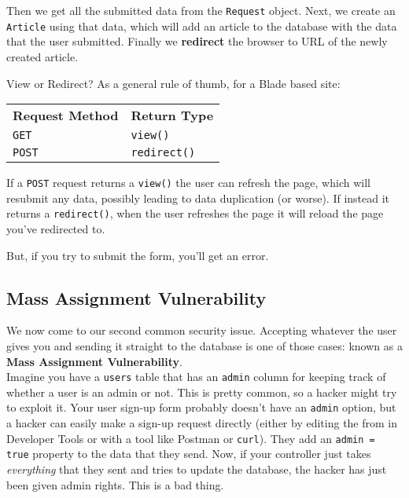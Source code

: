 Then we get all the submitted data from the \texttt{Request} object. Next, we create an \texttt{Article} using that data, which will add an article to the database with the data that the user submitted. Finally we \textbf{redirect} the browser to URL of the newly created article.

\begin{infobox}{View or Redirect?}
    As a general rule of thumb, for a Blade based site:
    \\

    \begin{tabularx}{\textwidth}{l X}
        \textbf{Request Method}  & \textbf{Return Type} \\
        \texttt{GET}             & \texttt{view()} \\
        \texttt{POST}            & \texttt{redirect()} \\
    \end{tabularx}

    \par\bigskip

    If a \texttt{POST} request returns a \texttt{view()} the user can refresh the page, which will resubmit any data, possibly leading to data duplication (or worse). If instead it returns a \texttt{redirect()}, when the user refreshes the page it will reload the page you've redirected to.
\end{infobox}

But, if you try to submit the form, you'll get an error.


\subsection{Mass Assignment Vulnerability}

We now come to our second common security issue. Accepting whatever the user gives you and sending it straight to the database is one of those cases: known as a \textbf{Mass Assignment Vulnerability}.
\\

Imagine you have a \texttt{users} table that has an \texttt{admin} column for keeping track of whether a user is an admin or not. This is pretty common, so a hacker might try to exploit it. Your user sign-up form probably doesn't have an \texttt{admin} option, but a hacker can easily make a sign-up request directly (either by editing the from in Developer Tools or with a tool like Postman or \texttt{curl}). They add an \texttt{admin = true} property to the data that they send. Now, if your controller just takes \textit{everything} that they sent and tries to update the database, the hacker has just been given admin rights. This is a bad thing.
\\

